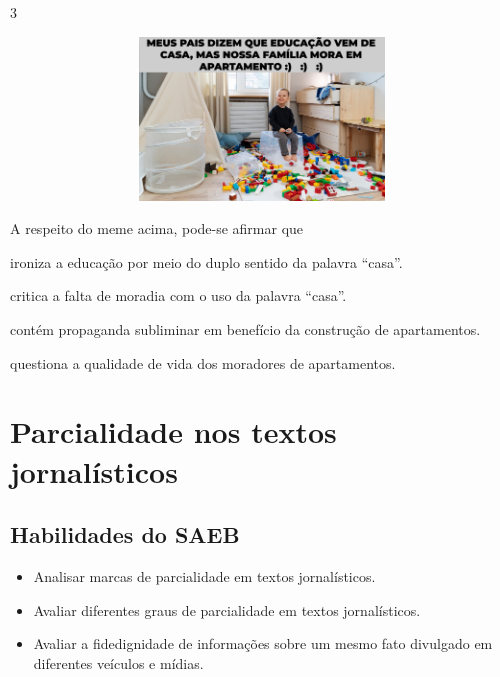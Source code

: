 \num{3}

\includegraphics[width=5.90551in,height=1.70833in]{./imgSAEB_7_POR/media/image7.png}

A respeito do meme acima, pode-se afirmar que

\begin{escolha}
    
    \item ironiza a educação por meio do duplo sentido da palavra ``casa''.
    
    \item critica a falta de moradia com o uso da palavra ``casa''.
    
    \item contém propaganda subliminar em benefício da construção de apartamentos.
    
    \item questiona a qualidade de vida dos moradores de apartamentos.

\end{escolha}


\chapter{Parcialidade nos textos jornalísticos}

\section{Habilidades do SAEB}

\begin{itemize}

  \item Analisar marcas de parcialidade em textos jornalísticos.

  \item Avaliar diferentes graus de parcialidade em textos jornalísticos.

  \item Avaliar a fidedignidade de informações sobre um mesmo fato divulgado 
  em diferentes veículos e mídias.

\end{itemize}

